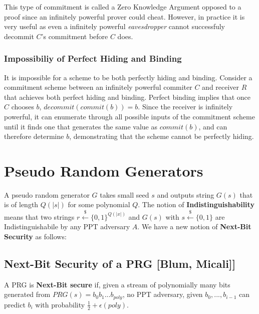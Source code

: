 \documentclass[11pt]{article}
\begin{document}
This type of commitment is called a Zero Knowledge Argument opposed to a proof since an infinitely powerful prover could cheat. However, in practice it is very useful as even a infinitely powerful \textit{eavesdropper} cannot successfuly decommit $C$'s commitment before $C$ does.

\subsubsection{Impossibiliy of Perfect Hiding and Binding}
It is impossible for a scheme to be both perfectly hiding and binding. Consider a commitment scheme between an infinitely powerful commiter $C$ and receiver $R$ that achieves both perfect hiding and binding. Perfect binding implies that once $C$ chooses $b$, $decommit(commit(b)) = b$. Since the receiver is infinitely powerful, it can enumerate through all possible inputs of the commitment scheme until it finds one that generates the same value as $commit(b)$, and can therefore determine $b$, demonstrating that the scheme cannot be perfectly hiding.

\section{Pseudo Random Generators}
A pseudo random generator $G$ takes small seed $s$ and outputs string $G(s)$ that is of length $Q(|s|)$ for some polynomial $Q$. The notion of \textbf{Indistinguishability} means that two strings $r \overset{\$}{\leftarrow} \{0,1\}^{Q(|x|)}$ and $G(s)$ with $s \overset{\$}{\leftarrow} \{0,1\}$ are Indistinguishabile by any PPT adversary $A$. We have a new notion of \textbf{Next-Bit Security} as follows:
\vspace{1em}

\subsection{Next-Bit Security of a PRG [Blum, Micali]]}
A PRG is \textbf{Next-Bit secure} if, given a stream of polynomially many bits generated from $PRG(s) = b_0b_1...b_{poly}$, no PPT adversary, given $b_0,...,b_{i-1}$ can predict $b_i$ with probability $\frac{1}{2} + \epsilon(poly)$.
\end{document}
